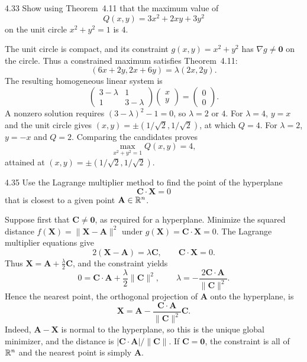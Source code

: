 \documentclass[11pt,oneside]{article}
\begin{document}
\begin{problem}{4.33}
Show using Theorem~4.11 that the maximum value of
\[
 Q(x,y)=3x^2+2xy+3y^2
\]
on the unit circle $x^2+y^2=1$ is $4$.
\end{problem}
\begin{solution}
The unit circle is compact, and its constraint
$g(x,y)=x^2+y^2$ has $\nabla g\ne\mathbf0$ on the circle.
Thus a constrained maximum satisfies Theorem~4.11:
\[
 (6x+2y,2x+6y)=\lambda(2x,2y).
\]
The resulting homogeneous linear system is
\[
 \begin{pmatrix}3-\lambda&1\\1&3-\lambda\end{pmatrix}
 \begin{pmatrix}x\\y\end{pmatrix}=\begin{pmatrix}0\\0\end{pmatrix}.
\]
A nonzero solution requires
$(3-\lambda)^2-1=0$, so $\lambda=2$ or $4$.
For $\lambda=4$, $y=x$ and the unit circle gives
$(x,y)=\pm(1/\sqrt2,1/\sqrt2)$, at which $Q=4$.
For $\lambda=2$, $y=-x$ and $Q=2$.
Comparing the candidates proves
\[
 \boxed{\max_{x^2+y^2=1}Q(x,y)=4},
\]
attained at $\boxed{(x,y)=\pm(1/\sqrt2,1/\sqrt2)}$.
\end{solution}

\begin{problem}{4.35}
Use the Lagrange multiplier method to find the point of the hyperplane
\[
 \mathbf C\cdot\mathbf X=0
\]
that is closest to a given point $\mathbf A\in\mathbb{R}^n$.
\end{problem}
\begin{solution}
Suppose first that $\mathbf C\ne\mathbf0$, as required for a
hyperplane. Minimize the squared distance
$f(\mathbf X)=\|\mathbf X-\mathbf A\|^2$ under
$g(\mathbf X)=\mathbf C\cdot\mathbf X=0$.
The Lagrange multiplier equations give
\[
 2(\mathbf X-\mathbf A)=\lambda\mathbf C,
 \qquad \mathbf C\cdot\mathbf X=0.
\]
Thus $\mathbf X=\mathbf A+\frac\lambda2\mathbf C$,
and the constraint yields
\[
 0=\mathbf C\cdot\mathbf A+\frac\lambda2\|\mathbf C\|^2,
 \qquad \lambda=-\frac{2\mathbf C\cdot\mathbf A}{\|\mathbf C\|^2}.
\]
Hence the nearest point, the orthogonal projection of $\mathbf A$
onto the hyperplane, is
\[
 \boxed{\mathbf X=\mathbf A-
  \frac{\mathbf C\cdot\mathbf A}{\|\mathbf C\|^2}\mathbf C}.
\]
Indeed, $\mathbf A-\mathbf X$ is normal to the hyperplane,
so this is the unique global minimizer, and the distance is
$\boxed{|\mathbf C\cdot\mathbf A|/\|\mathbf C\|}$.
If $\mathbf C=\mathbf0$, the constraint is all of $\mathbb{R}^n$
and the nearest point is simply $\mathbf A$.
\end{solution}
\end{document}
